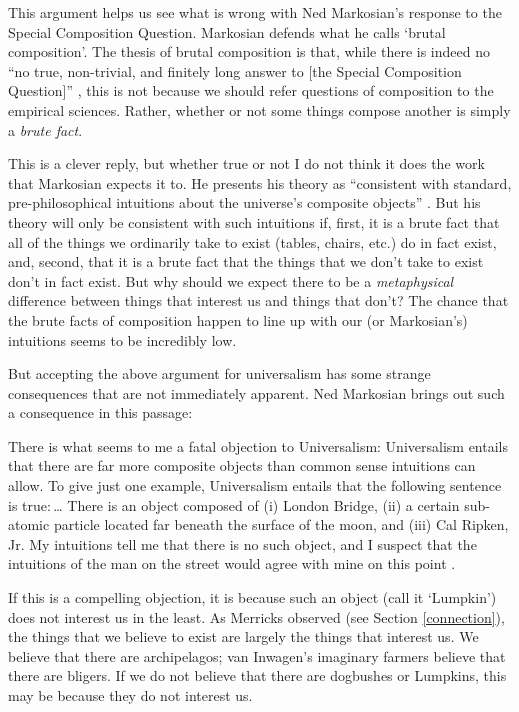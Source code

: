 \documentclass[11pt]{article}
\newenvironment{squote}{%
\begin{spacing}{1}
       	\begin{list}{}{%
\setlength{\labelwidth}{0pt}%
\rightmargin\leftmargin%
}
\item\relax
}{%
\end{list}%
\end{spacing}
}
\begin{document}
\begin{spacing}{1.25}
This argument helps us see what is wrong with Ned Markosian's response
to the Special Composition Question.  Markosian defends what he calls
`brutal composition'.  The thesis of brutal composition is that, while
there is indeed no ``no true, non-trivial, and finitely long answer to
[the Special Composition Question]''
\citeyearpar[214]{markosian1998a}, this is not because we should refer
questions of composition to the empirical sciences.  Rather, whether
or not some things compose another is simply a {\em brute fact}.

This is a clever reply, but whether true or not I do not think it does
the work that Markosian expects it to.  He presents his theory as
``consistent with standard, pre-philosophical intuitions about the
universe's composite objects'' \citeyearpar[211]{markosian1998a}.  But
his theory will only be consistent with such intuitions if, first, it
is a brute fact that all of the things we ordinarily take to exist
(tables, chairs, etc.) do in fact exist, and, second, that it is a
brute fact that the things that we don't take to exist don't in fact
exist.  But why should we expect there to be a {\em metaphysical}
difference between things that interest us and things that don't?  The
chance that the brute facts of composition happen to line up with our
(or Markosian's) intuitions seems to be incredibly low.

But accepting the above argument for universalism has some strange
consequences that are not immediately apparent.  Ned Markosian brings
out such a consequence in this passage:

\begin{squote}
There is what seems to me a fatal objection to Universalism:
Universalism entails that there are far more composite objects than
common sense intuitions can allow.  To give just one example,
Universalism entails that the following sentence is true:\,\ldots
There is an object composed of (i) London Bridge, (ii) a certain
sub-atomic particle located far beneath the surface of the moon, and
(iii) Cal Ripken, Jr.  My intuitions tell me that there is no such
object, and I suspect that the intuitions of the man on the street
would agree with mine on this point \citeyearpar[228]{markosian1998a}.
\end{squote}

If this is a compelling objection, it is because such an object (call
it `Lumpkin') does not interest us in the least.  As Merricks observed
(see Section \ref{connection}), the things that we believe to exist
are largely the things that interest us.  We believe that there are
archipelagos; van Inwagen's imaginary farmers believe that there are
bligers.  If we do not believe that there are dogbushes or Lumpkins,
this may be because they do not interest us.


\end{spacing}
\end{document}

